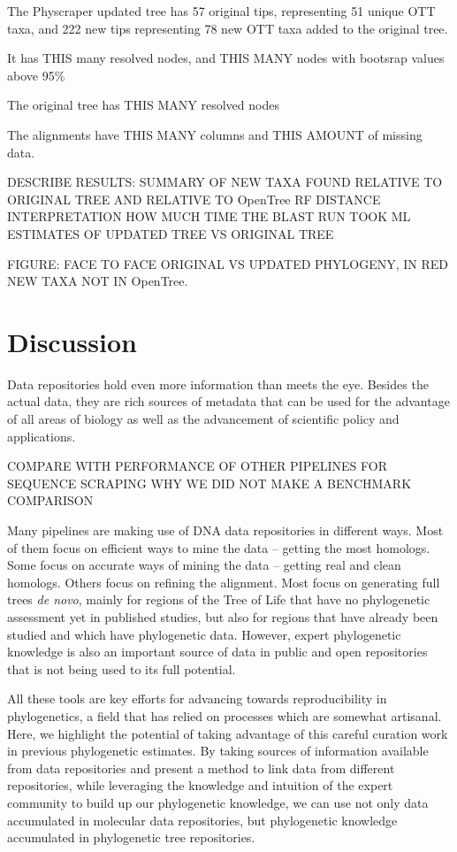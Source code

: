 \documentclass[]{article}
\begin{document}
The Physcraper updated tree has 57 original tips, representing 51 unique OTT taxa, and 222 new tips representing 78 new OTT taxa added to the original tree.

It has THIS many resolved nodes, and THIS MANY nodes with bootsrap values above 95\%

The original tree has THIS MANY resolved nodes

The alignments have THIS MANY columns and THIS AMOUNT of missing data.

DESCRIBE RESULTS: SUMMARY OF NEW TAXA FOUND RELATIVE TO ORIGINAL TREE AND RELATIVE TO OpenTree
RF DISTANCE INTERPRETATION
HOW MUCH TIME THE BLAST RUN TOOK
ML ESTIMATES OF UPDATED TREE VS ORIGINAL TREE

FIGURE: FACE TO FACE ORIGINAL VS UPDATED PHYLOGENY, IN RED NEW TAXA NOT IN OpenTree.

\newpage

\hypertarget{discussion}{%
\section{Discussion}\label{discussion}}

Data repositories hold even more information than meets the eye.
Besides the actual data, they are rich sources of metadata that can be used for the advantage of all areas of biology as well as the advancement of scientific policy and applications.

COMPARE WITH PERFORMANCE OF OTHER PIPELINES FOR SEQUENCE SCRAPING
WHY WE DID NOT MAKE A BENCHMARK COMPARISON

Many pipelines are making use of DNA data repositories in different ways.
Most of them focus on efficient ways to mine the data -- getting the most homologs.
Some focus on accurate ways of mining the data -- getting real and clean homologs.
Others focus on refining the alignment.
Most focus on generating full trees \emph{de novo}, mainly for regions of the Tree of
Life that have no phylogenetic assessment yet in published studies, but also for
regions that have already been studied and which have phylogenetic data.
However, expert phylogenetic knowledge is also an important source of data in public
and open repositories that is not being used to its full potential.

All these tools are key efforts for advancing towards reproducibility in phylogenetics,
a field that has relied on processes which are somewhat artisanal.
Here, we highlight the potential of taking advantage of this careful curation work in previous phylogenetic estimates. By taking sources of information available from data repositories and present a method to link data from different repositories, while leveraging the knowledge and intuition of the expert
community to build up our phylogenetic knowledge, we can use not only data accumulated in
molecular data repositories, but phylogenetic knowledge accumulated in phylogenetic tree repositories.
\end{document}
